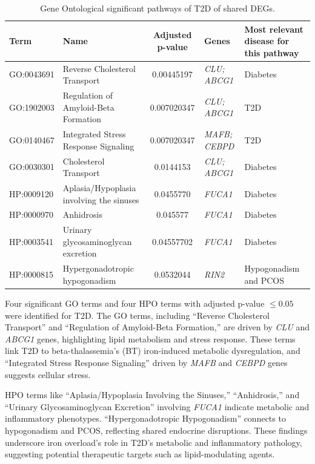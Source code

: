 \begin{table}[H]
\centering
\caption{Gene Ontological significant pathways of T2D of shared DEGs.}
\renewcommand{\arraystretch}{1.0} %
\small
\begin{tabularx}{\textwidth}{|l|X|c|X|X|}
\hline
\textbf{Term} & \textbf{Name} & \textbf{Adjusted p-value} & \textbf{Genes} & \textbf{Most relevant disease for this pathway} \\
\hline
GO:0043691 & Reverse Cholesterol Transport & 0.00445197 & \textit{CLU; ABCG1} & Diabetes \\
\hline
GO:1902003 & Regulation of Amyloid-Beta Formation & 0.007020347 & \textit{CLU; ABCG1} & T2D \\
\hline
GO:0140467 & Integrated Stress Response Signaling & 0.007020347 & \textit{MAFB; CEBPD} & T2D \\
\hline
GO:0030301 & Cholesterol Transport & 0.0144153 & \textit{CLU; ABCG1} & Diabetes \\
\hline
HP:0009120 & Aplasia/Hypoplasia involving the sinuses & 0.0455770 & \textit{FUCA1} & Diabetes \\
\hline
HP:0000970 & Anhidrosis & 0.045577 & \textit{FUCA1} & Diabetes \\
\hline
HP:0003541 & Urinary glycosaminoglycan excretion & 0.04557702 & \textit{FUCA1} & Diabetes \\
\hline
HP:0000815 & Hypergonadotropic hypogonadism & 0.0532044 & \textit{RIN2} & Hypogonadism and PCOS \\
\hline
\end{tabularx}
\end{table}

Four significant GO terms and four HPO terms with adjusted p-value $\leq 0.05$ were identified for T2D. The GO terms, including ``Reverse Cholesterol Transport'' and ``Regulation of Amyloid-Beta Formation,'' are driven by \textit{CLU} and \textit{ABCG1} genes, highlighting lipid metabolism and stress response. These terms link T2D to beta-thalassemia's (BT) iron-induced metabolic dysregulation, and ``Integrated Stress Response Signaling'' driven by \textit{MAFB} and \textit{CEBPD} genes suggests cellular stress.  

HPO terms like ``Aplasia/Hypoplasia Involving the Sinuses,'' ``Anhidrosis,'' and ``Urinary Glycosaminoglycan Excretion'' involving \textit{FUCA1} indicate metabolic and inflammatory phenotypes. ``Hypergonadotropic Hypogonadism'' connects to hypogonadism and PCOS, reflecting shared endocrine disruptions. These findings underscore iron overload's role in T2D's metabolic and inflammatory pathology, suggesting potential therapeutic targets such as lipid-modulating agents.

